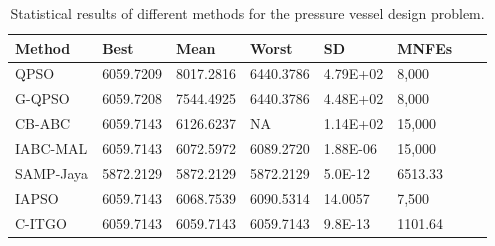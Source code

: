 
\begin{table*}[tp]
    \tiny
    \begin{center}
    
    \begin{tabular}{ P{2.0cm} P{2.0cm} P{2.0cm} P{2.0cm} P{2.0cm} P{2.0cm} P{2.0cm} P{2.0cm}  }
    \hline
    \textbf{Method} & \textbf{Best} & \textbf{Mean} & \textbf{Worst} & \textbf{SD} & \textbf{MNFEs} \\
    \hline
    
    QPSO & 6059.7209 & 8017.2816 & 6440.3786 & 4.79E+02 & 8,000 \\
    G-QPSO & 6059.7208 & 7544.4925 & 6440.3786 & 4.48E+02 & 8,000 \\
    CB-ABC & 6059.7143 & 6126.6237 & NA & 1.14E+02 & 15,000 \\
    IABC-MAL & 6059.7143 & 6072.5972 & 6089.2720 & 1.88E-06 & 15,000 \\
    SAMP-Jaya & 5872.2129 & 5872.2129 & 5872.2129 & 5.0E-12 & 6513.33 \\    
    IAPSO & 6059.7143 & 6068.7539 & 6090.5314 & 14.0057 & 7,500 \\
    C-ITGO & 6059.7143 & 6059.7143 & 6059.7143 & 9.8E-13 & 1101.64 \\
    
    \hline
    \end{tabular}
    \end{center}
    
    \caption{ Statistical results of different methods for the pressure vessel design problem. \\[1em]}
    \label{tab:PV}
    \end{table*}
    
    